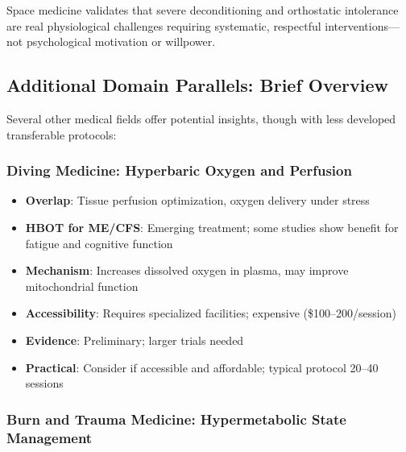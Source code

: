 Space medicine validates that severe deconditioning and orthostatic intolerance are real physiological challenges requiring systematic, respectful interventions—not psychological motivation or willpower.

\subsection{Additional Domain Parallels: Brief Overview}
\label{subsec:additional-parallels}

Several other medical fields offer potential insights, though with less developed transferable protocols:

\subsubsection{Diving Medicine: Hyperbaric Oxygen and Perfusion}

\begin{itemize}
    \item \textbf{Overlap}: Tissue perfusion optimization, oxygen delivery under stress
    \item \textbf{HBOT for ME/CFS}: Emerging treatment; some studies show benefit for fatigue and cognitive function
    \item \textbf{Mechanism}: Increases dissolved oxygen in plasma, may improve mitochondrial function
    \item \textbf{Accessibility}: Requires specialized facilities; expensive (\$100--200/session)
    \item \textbf{Evidence}: Preliminary; larger trials needed
    \item \textbf{Practical}: Consider if accessible and affordable; typical protocol 20--40 sessions
\end{itemize}

\subsubsection{Burn and Trauma Medicine: Hypermetabolic State Management}

